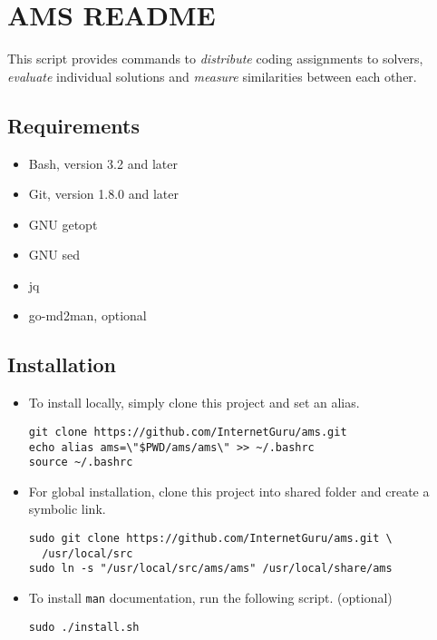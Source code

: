 \chapter{AMS README}\label{ams-readme}

This script provides commands to \emph{distribute} coding assignments to solvers, \emph{evaluate} individual solutions and \emph{measure} similarities between each other.

\section{Requirements}\label{requirements}

\begin{itemize}
\item
  Bash, version 3.2 and later
\item
  Git, version 1.8.0 and later
\item
  GNU getopt
\item
  GNU sed
\item
  jq
\item
  go-md2man, optional
\end{itemize}

\section{Installation}\label{installation}

\begin{itemize}
\item
  To install locally, simply clone this project and set an alias.

\begin{verbatim}
git clone https://github.com/InternetGuru/ams.git
echo alias ams=\"$PWD/ams/ams\" >> ~/.bashrc
source ~/.bashrc
\end{verbatim}

\item
  For global installation, clone this project into shared folder and create a symbolic link.

\begin{verbatim}
sudo git clone https://github.com/InternetGuru/ams.git \
  /usr/local/src
sudo ln -s "/usr/local/src/ams/ams" /usr/local/share/ams
\end{verbatim}

\item
  To install \texttt{man} documentation, run the following script. (optional)

\begin{verbatim}
sudo ./install.sh
\end{verbatim}

\end{itemize}

